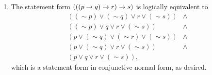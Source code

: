 \begin{enumerate}
\begin{enumerate}[label = (\alph*), align = left]
      \item The statement form \((((p \rightarrow q) \rightarrow r) \rightarrow s)\) is logically equivalent to
        \[
          \begin{array}{cc}
            ((\sim p) \lor (\sim q) \lor r \lor (\sim s))&
            \land\\
            ((\sim p) \lor q \lor r \lor (\sim s))&
            \land\\
            (p \lor (\sim q) \lor (\sim r) \lor (\sim s))&
            \land\\
            (p \lor (\sim q) \lor r \lor (\sim s))&
            \land\\
            (p \lor q \lor r \lor (\sim s)),&
          \end{array}
        \]
        which is a statement form in conjunctive normal form, as desired.
    \end{enumerate}
\end{enumerate}
